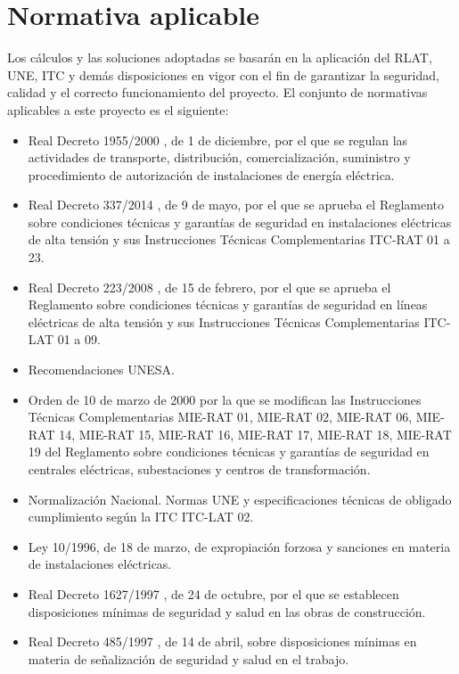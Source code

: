 \section{Normativa aplicable}
\label{sec:md-normativa}
Los cálculos y las soluciones adoptadas se basarán en la aplicación del \ac{RLAT}, \ac{UNE}, \ac{ITC} y demás disposiciones en vigor con el fin de garantizar la seguridad, calidad y el correcto funcionamiento del proyecto. El conjunto de normativas aplicables a este proyecto es el siguiente:
\begin{itemize}
  \item Real Decreto 1955/2000 \cite{RD1955_2000}, de 1 de diciembre, por el que se regulan las actividades de transporte, distribución, comercialización, suministro y procedimiento de autorización de instalaciones de energía eléctrica.
  \item Real Decreto 337/2014 \cite{RD337_2014}, de 9 de mayo, por el que se aprueba el Reglamento sobre condiciones técnicas y garantías de seguridad en instalaciones eléctricas de alta tensión y sus Instrucciones Técnicas Complementarias ITC-RAT 01 a 23.
  \item Real Decreto 223/2008 \cite{RD223_2008}, de 15 de febrero, por el que se aprueba el Reglamento sobre condiciones técnicas y garantías de seguridad en líneas eléctricas de alta tensión y sus Instrucciones Técnicas Complementarias ITC-LAT 01 a 09.
  \item Recomendaciones UNESA.
  \item Orden de 10 de marzo de 2000 \cite{OM_2000_03_10_MIERAT} por la que se modifican las Instrucciones Técnicas Complementarias MIE-RAT 01, MIE-RAT 02, MIE-RAT 06, MIE-RAT 14, MIE-RAT 15, MIE-RAT 16, MIE-RAT 17, MIE-RAT 18, MIE-RAT 19 del Reglamento sobre condiciones técnicas y garantías de seguridad en centrales eléctricas, subestaciones y centros de transformación.
  \item Normalización Nacional. Normas \ac{UNE} y especificaciones técnicas de obligado cumplimiento según la \ac{ITC} ITC-LAT 02.
  \item Ley 10/1996, de 18 de marzo, de expropiación forzosa y sanciones en materia de instalaciones eléctricas.
  \item Real Decreto 1627/1997 \cite{RD1627_1997}, de 24 de octubre, por el que se establecen
 disposiciones mínimas de seguridad y salud en las obras de
 construcción.
 \item Real Decreto 485/1997 \cite{RD485_1997}, de 14 de abril, sobre disposiciones mínimas en
 materia de señalización de seguridad y salud en el trabajo.

\end{itemize}
